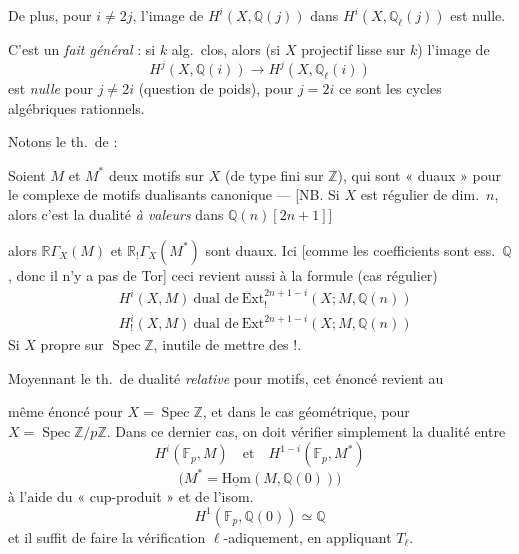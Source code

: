 \documentclass[11pt,a4paper]{article}
\begin{document}
De plus, pour $i \neq 2j$, l'image de $H^{i}(X, \mathbb{Q}(j))$ dans
$H^{i}(X, \mathbb{Q}_{\ell}(j))$ est nulle.

C'est un \emph{fait général} : si $k$ alg.\ clos, alors
(si $X$ projectif lisse sur $k$) l'image de
\[
  H^{j}(X, \mathbb{Q}(i)) \longrightarrow H^{j}(X, \mathbb{Q}_{\ell}(i))
\]
est \emph{nulle} pour $j \neq 2i$ (question de poids), pour $j = 2i$
ce sont les cycles algébriques 
rationnels.

Notons le th.\ de   :

Soient $M$ et $M^{*}$ deux  motifs sur $X$
(de type fini sur $\mathbb{Z}$), qui sont « duaux » pour le
complexe de motifs dualisants \struck{\ill{}} canonique ---
[NB. Si $X$ est régulier  de dim.\ $n$, alors c'est la
dualité \emph{à valeurs} dans $\mathbb{Q}(n)[2n+1]$]

alors $\mathbb{R}\Gamma_{X}(M)$ et $\mathbb{R}_{!}\Gamma_{X}(M^{*})$ sont
duaux.
Ici [comme les coefficients sont ess.\ $\mathbb{Q}$, donc il n'y a pas de
Tor] ceci revient aussi à la formule (cas régulier)
\[
  \boxed{\;
  \begin{aligned}
    &H^{i}(X, M) \ \text{dual de}\ \mathrm{Ext}_{!}^{2n+1-i}(X ; M, \mathbb{Q}(n)) \\
    &H^{i}_{!}(X, M) \ \text{dual de}\ \mathrm{Ext}^{2n+1-i}(X ; M, \mathbb{Q}(n))
  \end{aligned}
  \;}
\]
Si $X$ propre sur $\operatorname{Spec} \mathbb{Z}$, inutile de mettre des
$!$.

Moyennant le th.\ de dualité \emph{relative} pour motifs, cet énoncé revient
au

même énoncé pour $X = \operatorname{Spec} \mathbb{Z}$, et dans
le cas géométrique, pour $X = \operatorname{Spec} \mathbb{Z}/p\mathbb{Z}$.
Dans ce dernier cas, on doit vérifier simplement la dualité entre
\[
  H^{i}(\mathbb{F}_{p}, M) \quad \text{et} \quad H^{1-i}(\mathbb{F}_{p}, M^{*})
\]
\[
  \bigl( M^{*} = \underline{\mathrm{Hom}}(M, \mathbb{Q}(0)) \bigr)
\]
à l'aide du « cup-produit » et de l'isom.
\[
  H^{1}(\mathbb{F}_{p}, \mathbb{Q}(0)) \simeq \mathbb{Q}
\]
et il suffit de faire la vérification $\ell$-adiquement, en appliquant
$T_{\ell}$.
\end{document}
